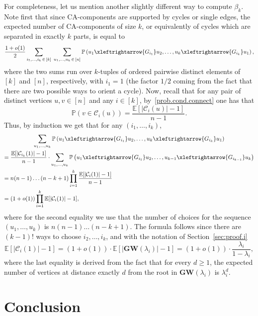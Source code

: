 \documentclass[AHL,Unicode,longabstracts,published]{cedram}
\newcommand{\GW}{\mathbf{GW}}
\renewcommand{\Pr}{\mathbb{P}}
\newcommand{\bbE}{\mathbb{E}}
\newcommand{\cC}{\mathcal{C}}
\begin{document}
\begin{rema}
For completeness, let us mention another slightly different way to compute $\beta_k$. Note first that since CA-components are supported by cycles or single edges, the expected number of CA-components of size $k$, or equivalently of cycles which are separated in exactly $k$ parts, is equal to
\[
\frac {1+o(1)}2 \sum_{i_1,\dots,i_k\,\in\,[k]}\;\sum_{u_1, \dots, u_k\,\in\,[n]}
\Pr\left(u_1 \xleftrightarrow{G_{i_1}} u_2, \dots, u_k\xleftrightarrow{G_{i_k}} u_1\right),
\]
where the two sums run over $k$-tuples of ordered pairwise distinct elements of $[k]$ and $[n]$, respectively, with $i_1=1$ (the factor $1/2$ coming from the fact that there are two possible ways to orient a cycle). Now, recall that for any pair of distinct vertices $u,v \in [n]$ and any $i\in [k]$, by~\eqref{prob.cond.connect} one has that
\[
\Pr(v\in \cC_i(u)) = \frac{\bbE[|\cC_i(u)|-1]}{n-1}.
\]
Thus, by induction we get that for any $(i_1,\dots,i_k)$,
\begin{multline*}
\sum_{u_1,\dots,u_k} \Pr\left(u_1 \xleftrightarrow{G_{i_1}} u_2, \dots, u_k\xleftrightarrow{G_{i_k}} u_1\right)\\
\begin{aligned}
= \; &\frac{\bbE[|\cC_{i_k}(1)|-1]}{n-1}\cdot \sum_{u_1,\dots,u_k}
\Pr\left(u_1 \xleftrightarrow{G_{i_1}} u_2, \dots, u_{k-1}\xleftrightarrow{G_{i_{k-1}}} u_k\right)\\
= \; &n(n-1)\dots(n-k+1)\prod_{i=1}^k \frac{\bbE[|\cC_i(1)|-1]}{n-1}\\
= \; &(1+o(1)) \prod_{i=1}^k \bbE[|\cC_i(1)|-1],
\end{aligned}
\end{multline*}
where for the second equality we use that the number of choices for the sequence $(u_1,\dots,u_k)$ is $n(n-1)\dots(n-k+1)$. The formula follows since there are $(k-1)!$ ways to choose $i_2,\dots,i_k$, and with the notation of Section~\ref{sec:proof.i}
\[
\bbE[|\cC_i(1)|-1] = (1+o(1))\cdot \bbE[|\GW(\lambda_i)|-1] = (1+o(1))\cdot \frac{\lambda_i}{1-\lambda_i},
\]
where the last equality is derived from the fact that for every $d\ge 1$, the expected number of vertices at distance exactly $d$ from the root in $\GW(\lambda_i)$ is $\lambda_i^d$.
\end{rema}

\section{Conclusion}\label{sec:discussion}
\end{document}
